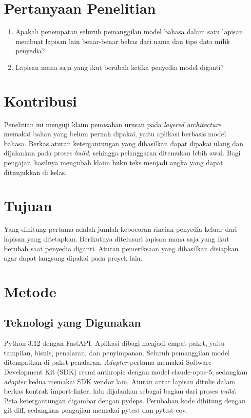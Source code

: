 \documentclass[11pt,a4paper]{article}
\begin{document}
\section{Pertanyaan Penelitian}

\begin{enumerate}[label=\textbf{Pertanyaan \arabic*.}, leftmargin=*, labelsep=0.5em]
  \item Apakah penempatan seluruh pemanggilan model bahasa dalam satu lapisan membuat lapisan lain benar-benar bebas dari nama dan tipe data milik penyedia?
  \item Lapisan mana saja yang ikut berubah ketika penyedia model diganti?
\end{enumerate}

\section{Kontribusi}

Penelitian ini menguji klaim pemisahan urusan pada \textit{layered architecture} memakai bahan yang belum pernah dipakai, yaitu aplikasi berbasis model bahasa. Berkas aturan ketergantungan yang dihasilkan dapat dipakai ulang dan dijalankan pada proses \textit{build}, sehingga pelanggaran ditemukan lebih awal. Bagi pengajar, hasilnya mengubah klaim buku teks menjadi angka yang dapat ditunjukkan di kelas.

\section{Tujuan}

Yang dihitung pertama adalah jumlah kebocoran rincian penyedia keluar dari lapisan yang ditetapkan. Berikutnya ditelusuri lapisan mana saja yang ikut berubah saat penyedia diganti. Aturan pemeriksaan yang dihasilkan disiapkan agar dapat langsung dipakai pada proyek lain.

\section{Metode}

\subsection{Teknologi yang Digunakan}

Python 3.12 dengan FastAPI. Aplikasi dibagi menjadi empat paket, yaitu tampilan, bisnis, penalaran, dan penyimpanan. Seluruh pemanggilan model ditempatkan di paket penalaran. \textit{Adapter} pertama memakai Software Development Kit (SDK) resmi anthropic dengan model claude-opus-5, sedangkan \textit{adapter} kedua memakai SDK vendor lain. Aturan antar lapisan ditulis dalam berkas kontrak import-linter, lalu dijalankan sebagai bagian dari proses \textit{build}. Peta ketergantungan digambar dengan pydeps. Perubahan kode dihitung dengan git diff, sedangkan pengujian memakai pytest dan pytest-cov.
\end{document}
